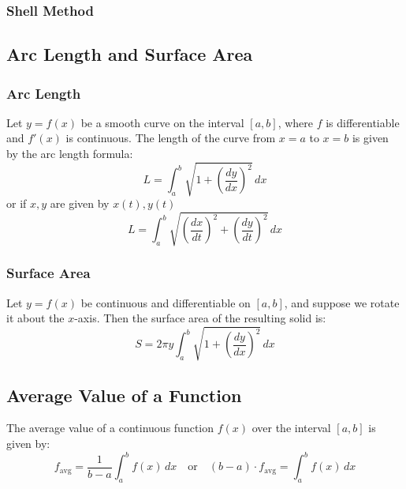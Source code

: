 \documentclass[11pt]{article}
\begin{document}
\subsubsection{Shell Method}
\subsection{Arc Length and Surface Area}
\subsubsection{Arc Length}
Let $y = f(x)$ be a smooth curve on the interval $[a, b]$, where $f$ is differentiable and $f'(x)$ is continuous. The length of the curve from $x = a$ to $x = b$ is given by the arc length formula:
\[
    L = \int_a^b \sqrt{1 + \left(\frac{dy}{dx}\right)^2} \, dx
\]
or if $x, y$ are given by $x(t), y(t)$
\[
    L = \int_a^b \sqrt{\left(\frac{dx}{dt}\right)^2 + \left(\frac{dy}{dt}\right)^2} \, dx
\]
\subsubsection{Surface Area}
Let $y = f(x)$ be continuous and differentiable on $[a, b]$, and suppose we rotate it about the $x$-axis. Then the surface area of the resulting solid is:
\[
    S = 2\pi y \int_a^b \sqrt{1 + \left(\frac{dy}{dx}\right)^2} \, dx
\]

\subsection{Average Value of a Function}
The average value of a continuous function $f(x)$ over the interval $[a, b]$ is given by:
\[
    f_{\text{avg}} = \frac{1}{b - a} \int_a^b f(x)\,dx
    \quad\text{or}
    \quad(b-a)\cdot f_{\text{avg}}=\int_a^b f(x)\,dx
\]
\begin{figure}[H]
    \centering
\end{figure}
\end{document}
